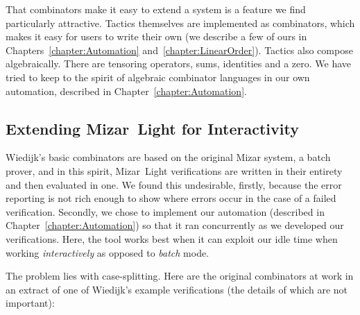 That combinators make it easy to extend a system is a feature we find particularly attractive. Tactics themselves are implemented as combinators, which makes it easy for users to write their own (we describe a few of ours in Chapters~\ref{chapter:Automation} and~\ref{chapter:LinearOrder}). Tactics also compose algebraically. There are tensoring operators, sums, identities and a zero. We have tried to keep to the spirit of algebraic combinator languages in our own automation, described in Chapter~\ref{chapter:Automation}.

\subsection{Extending Mizar~Light for Interactivity}\label{sec:MizarLightExtend}
Wiedijk's basic combinators are based on the original Mizar system, a batch prover, and in this spirit, Mizar~Light verifications are written in their entirety and then evaluated in one. We found this undesirable, firstly, because the error reporting is not rich enough to show where errors occur in the case of a failed verification. Secondly, we chose to implement our automation (described in Chapter~\ref{chapter:Automation}) so that it ran concurrently as we developed our verifications. Here, the tool works best when it can exploit our idle time when working \emph{interactively} as opposed to \emph{batch} mode.

The problem lies with case-splitting. Here are the original combinators at work in an extract of one of Wiedijk's example verifications (the details of which are not important):

\vspace{0.5cm}
\begin{minipage}{\linewidth}
  \footnotesize



  \code{\enspace [fix ["p1:Point"; "p2:Point"];}


  \code{\quad\enspace[[suppose "p1 = p2";}

  \code{\qquad\enspace qed from [0] by [LEMMA1]];}

  \code{\qquad [suppose "$\neg$(p1 = p2)";}

  \code{\qquad\enspace qed from [1]]]];}

\end{minipage}
\vspace{0.5cm}

